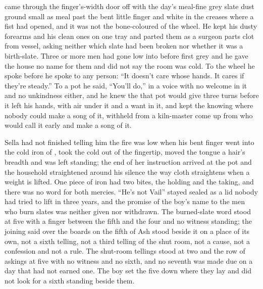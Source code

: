  came through the finger's-width door off  with the day's meal-fine grey slate dust ground small as meal past the bent little finger and white in the creases where a fist had opened, and it was not the bone-coloured  of the wheel. He kept his dusty forearms and his clean ones on one tray and parted them as a surgeon parts clot from vessel, asking neither which slate had been broken nor whether it was a birth-slate. Three or more men had gone low into  before first grey and he gave the house no name for them and did not say the room was cold. To the wheel he spoke before he spoke to any person: “It doesn't care whose hands. It cares if they're steady.” To a pot he said, “You'll do,” in a voice with no welcome in it and no unkindness either, and he knew the  that pot would give three turns before it left his hands, with air under it and a want in it, and kept the knowing where nobody could make a song of it, withheld from a kiln-master come up from  who would call it early and make a song of it.

Sella had not finished telling him the fire was low when his bent finger went into the cold iron of , took the cold out of the fingertip, moved the tongue a hair's breadth and was left standing; the end of her instruction arrived at the pot and the household straightened around his silence the way cloth straightens when a weight is lifted. One piece of iron had two bites, the holding and the taking, and there was no  word for both mercies. “He's not Vail” stayed sealed as a lid nobody had tried to lift in three years, and the promise of the boy's name to the men who burn slates was neither given nor withdrawn. The burned-slate word stood at five with a finger between the fifth and the four and no witness standing; the joining said over the boards on the fifth of Ash stood beside it on a place of its own, not a sixth telling, not a third telling of the shut room, not a cause, not a confession and not a rule. The shut-room tellings stood at two and the row of askings at five with no witness and no sixth, and no seventh was made due on a day that had not earned one. The boy set the five down where they lay and did not look for a sixth standing beside them.

\scenebreak

